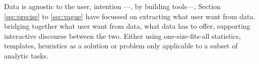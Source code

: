 Data is agnostic to the user, intention ---, by building tools---, Section \ref{sec:precise} to \ref{sec:vague} have focussed on extracting what user want from data. bridging together what user want from data, what data has to offer, supporting interactive discourse between the two. 
 Either using one-size-fits-all statistics, templates, heuristics as a solution or problem only applicable to a subset of analytic tasks\cite{Vartak2015,Vartak2017}. 